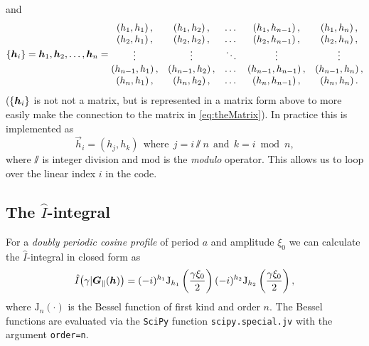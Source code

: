and
\begin{align*}
    \cbr{\vec h_i} = \vec h_1, \vec h_2, \dots, \vec h_n =
    \begin{matrix}
        \del{h_1, h_1}, &\del{h_1, h_2}, &\dots &\del{h_1, h_{n-1}}, &\del{h_1, h_n}, \\
        \del{h_2, h_1}, &\del{h_2, h_2}, &\dots &\del{h_2, h_{n-1}}, &\del{h_2, h_n}, \\
        \vdots &\vdots &\ddots &\vdots &\vdots  \\
        \del{h_{n-1}, h_1}, &\del{h_{n-1}, h_2}, &\dots &\del{h_{n-1}, h_{n-1}}, &\del{h_{n-1}, h_n}, \\
        \del{h_n, h_1}, &\del{h_n, h_2}, &\dots &\del{h_n, h_{n-1}}, &\del{h_n, h_n}.
    \end{matrix}
\end{align*}
($\cbr{\vec h_i}$ is not not a matrix, but is represented in a matrix form above to more easily make the connection to the matrix in \cref{eq:theMatrix}). In practice this is implemented as
\begin{equation}
    \vec h_ i = (h_j, h_k) ~~\text{where}~~ j = i \sslash n ~~\text{and}~~ k = i \bmod n,
\end{equation}
where $\sslash$ is integer division and $\mathrm{mod}$ is the \emph{modulo} operator. This allows us to loop over the linear index $i$ in the code.

\subsection*{The $\hat I$-integral}
For a \emph{doubly periodic cosine profile} of period $a$ and amplitude $\xi_0$ we can calculate the $\hat I$-integral in closed form as \cite{maradudin2018features}
\begin{equation}
    \hat I\del[1]{\gamma\vert \vec G_\|(\vec h)} = (-i)^{h_1} \mathrm{J}_{h_1}\del{\frac{\gamma\xi_0}{2}} (-i)^{h_2} \mathrm{J}_{h_2}\del{\frac{\gamma\xi_0}{2}},
\end{equation}
where $\mathrm{J}_n(\cdot)$ is the Bessel function of first kind and order $n$. The Bessel functions are evaluated via the \texttt{SciPy} function \texttt{scipy.special.jv} with the argument \texttt{order=n}.

